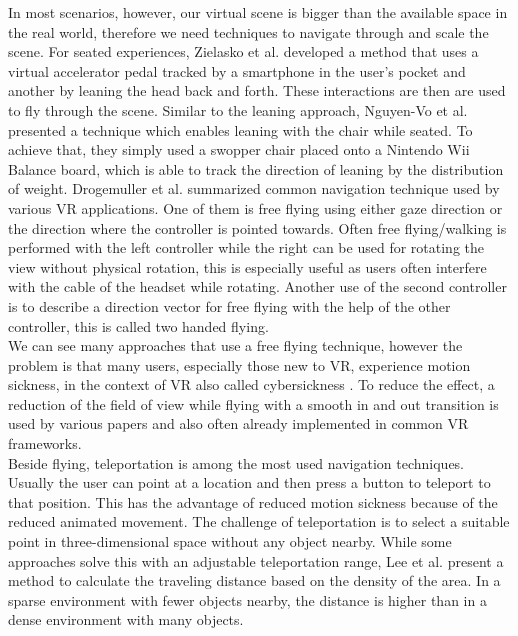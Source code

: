In most scenarios, however, our virtual scene is bigger than the available space in the real world, therefore we need techniques to navigate through and scale the scene. For seated experiences, Zielasko et al. \cite{zielasko_remain_2017} developed a method that uses a virtual accelerator pedal tracked by a smartphone in the user's pocket and another by leaning the head back and forth. These interactions are then are used to fly through the scene. Similar to the leaning approach, Nguyen-Vo et al. \cite{nguyen-vo_simulated_2018} presented a technique which enables leaning with the chair while seated. To achieve that, they simply used a swopper chair placed onto a Nintendo Wii Balance board, which is able to track the direction of leaning by the distribution of weight.  
Drogemuller et al. \cite{drogemuller_examining_2020} summarized common navigation technique used by various VR applications. One of them is free flying using either gaze direction or the direction where the controller is pointed towards. Often free flying/walking is performed with the left controller while the right can be used for rotating the view without physical rotation, this is especially useful as users often interfere with the cable of the headset while rotating. Another use of the second controller is to describe a direction vector for free flying with the help of the other controller, this is called two handed flying.\\
We can see many approaches that use a free flying technique, however the problem is that many users, especially those new to VR, experience motion sickness, in the context of VR also called cybersickness \cite{zielasko_remain_2017}.
To reduce the effect, a reduction of the field of view while flying with a smooth in and out transition is used by various papers and also often already implemented in common VR frameworks.\\
Beside flying, teleportation is among the most used navigation techniques. Usually the user can point at a location and then press a button to teleport to that position.
This has the advantage of reduced motion sickness because of the reduced animated movement. The challenge of teleportation is to select a suitable point in three-dimensional space without any object nearby. While some approaches solve this with an adjustable teleportation range, Lee et al. \cite{lee_evaluating_2020} present a method to calculate the traveling distance based on the density of the area. In a sparse environment with fewer objects nearby, the distance is higher than in a dense environment with many objects.\\
